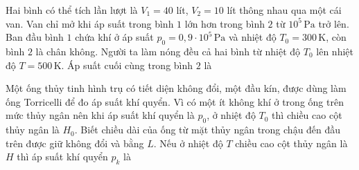 \begin{ex}
Hai bình có thể tích lần lượt là $V_1=40$ lít, $V_2=10$ lít thông nhau qua một cái van. Van chỉ mở khi áp suất trong bình $1$ lớn hơn trong bình $2$ từ $10^5\,\mathrm{Pa}$ trở lên. Ban đầu bình $1$ chứa khí ở áp suất $p_0=0,9\cdot 10^5\,\mathrm{Pa}$ và nhiệt độ $T_0=300\,\mathrm{K}$, còn bình $2$ là chân không. Người ta làm nóng đều cả hai bình từ nhiệt độ $T_0$ lên nhiệt độ $T=500\,\mathrm{K}$. Áp suất cuối cùng trong bình $2$ là
\end{ex}

\begin{ex}
Một ống thủy tinh hình trụ có tiết diện không đổi, một đầu kín, được dùng làm ống Torricelli để đo áp suất khí quyển. Vì có một ít không khí ở trong ống trên mức thủy ngân nên khi áp suất khí quyển là $p_0$, ở nhiệt độ $T_0$ thì chiều cao cột thủy ngân là $H_0$. Biết chiều dài của ống từ mặt thủy ngân trong chậu đến đầu trên được giữ không đổi và bằng $L$. Nếu ở nhiệt độ $T$ chiều cao cột thủy ngân là $H$ thì áp suất khí quyển $p_k$ là
\end{ex}


